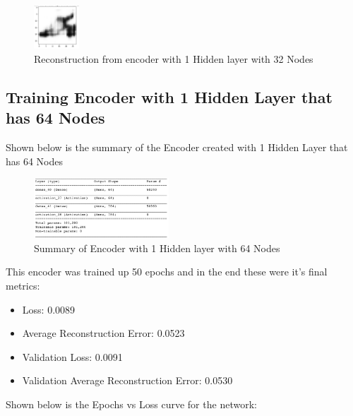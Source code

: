 \documentclass[conference]{IEEEtran}
\begin{document}
    \begin{figure}[H]
        \centering
        \captionsetup{justification=centering}
        \centering
            \includegraphics[width=0.15\textwidth]{6.png}
            \caption{Reconstruction from encoder with 1 Hidden layer with 32 Nodes}
    \end{figure}

    \subsection{Training Encoder with 1 Hidden Layer that has 64 Nodes}

    Shown below is the summary of the Encoder created with 1 Hidden Layer that has 64 Nodes

    \begin{figure}[H]
        \centering
        \captionsetup{justification=centering}
        \centering
            \includegraphics[width=0.45\textwidth]{7.png}
            \caption{Summary of Encoder with 1 Hidden layer with 64 Nodes}
    \end{figure}

    This encoder was trained up 50 epochs and in the end these were it's final metrics:

    \begin{itemize}
        \item Loss: 0.0089
        \item Average Reconstruction Error: 0.0523
        \item Validation Loss: 0.0091
        \item Validation Average Reconstruction Error: 0.0530
    \end{itemize}

    Shown below is the Epochs vs Loss curve for the network:
\end{document}
